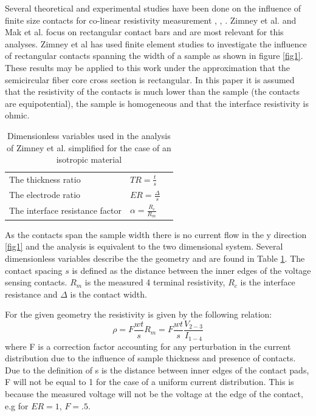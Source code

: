  Several theoretical and experimental studies have been done on the influence of finite size contacts for co-linear resistivity measurement \cite{Zimney2007CorrectionStudy}, \cite{Mak1989SpecificArsenide}, \cite{Ilse2014GeometricalMeasurements} \cite{Esposito2000DeterminationCrystals}. Zimney et al. and Mak et al. focus on rectangular contact bars and are most relevant for this analyses. Zimney et al has used finite element studies to investigate the influence of rectangular contacts spanning the width of a sample as shown in figure \ref{fig1}. These results may be applied to this work under the approximation that the semicircular fiber core cross section is rectangular. In this paper it is assumed that the resistivity of the contacts is much lower than the sample (the contacts are equipotential), the sample is homogeneous and that the interface resistivity is ohmic.%
 
 \begin{table}[b]
\begin{center}
    \begin{tabular}{|l|l|l|  }
    \hline
     The thickness ratio & $TR = \frac{t}{s}$ \\ 
     The electrode ratio & $ER =  \frac{\Delta}{s}$ \\ 
     The interface resistance factor & $\alpha = \frac{R_c}{R_m}$ \\
     \hline
    \end{tabular}
\end{center}
\caption{Dimensionless variables used in the analysis of Zimney et al. simplified for the case of an isotropic material \cite{Zimney2007CorrectionStudy}}
\label{Tab1}
\end{table}
 
As the contacts span the sample width there is no current flow in the y direction \ref{fig1} and the analysis is equivalent to the two dimensional system. Several dimensionless variables describe the the geometry and are found in Table \ref{Tab1}. The contact spacing $s$ is defined as the distance between the inner edges of the voltage sensing contacts. $R_m$ is the measured 4 terminal resistivity, $R_c$ is the interface resistance and $\Delta$ is the contact width. 

For the given geometry the resistivity is given by the following relation: 
\begin{equation}
    \rho   = F \frac{wt}{s}R_m = F \frac{wt}{s}\frac{V_{2-3}}{I_{1-4}}
\end{equation} 
where F is a correction factor accounting for any perturbation in the current distribution due to the influence of sample thickness and presence of contacts. Due to the definition of s is the distance between inner edges of the contact pads, F will not be equal to 1 for the case of a uniform current distribution. This is because the measured voltage will not be the voltage at the edge of the contact, e.g for $ER = 1$, $F = .5$.

